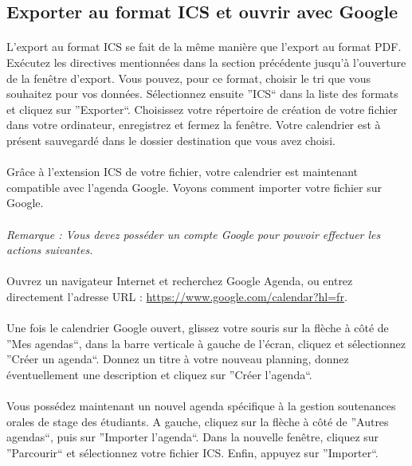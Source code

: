 \documentclass[a4paper,10pt]{report}
\begin{document}
      \subsection{Exporter au format ICS et ouvrir avec Google}
	  
	\paragraph{}
	  L'export au format ICS se fait de la même manière que l'export au format PDF.
	  Exécutez les directives mentionnées dans la section précédente jusqu'à l'ouverture de la fenêtre d'export.
	  Vous pouvez, pour ce format, choisir le tri que vous souhaitez pour vos données.
	  Sélectionnez ensuite ''ICS`` dans la liste des formats et cliquez sur ''Exporter``.
	  Choisissez votre répertoire de création de votre fichier dans votre ordinateur, enregistrez  et fermez la fenêtre.
	  Votre calendrier est à présent sauvegardé dans le dossier destination que vous avez choisi.
	  
	\paragraph{}
	  Grâce à l'extension ICS de votre fichier, votre calendrier est maintenant compatible avec l'agenda Google.
	  Voyons comment importer votre fichier sur Google.
	  
	  
	\paragraph{}
	  \textit{Remarque : Vous devez posséder un compte Google pour pouvoir effectuer les actions suivantes.}
	
	\paragraph{}
	  Ouvrez un navigateur Internet et recherchez Google Agenda, ou entrez directement l'adresse URL : \url{https://www.google.com/calendar?hl=fr}.
	  ~\\~\\
	  Une fois le calendrier Google ouvert, glissez votre souris sur la flèche à côté de ''Mes agendas``, dans la barre verticale à gauche de l'écran, cliquez et sélectionnez ''Créer un agenda``.
	  Donnez un titre à votre nouveau planning, donnez éventuellement une description et cliquez sur ''Créer l'agenda``.
	  ~\\~\\
	  Vous possédez maintenant un nouvel agenda spécifique à la gestion soutenances orales de stage des étudiants.
	  A gauche, cliquez sur la flèche à côté de ''Autres agendas``, puis sur ''Importer l'agenda``.
	  Dans la nouvelle fenêtre, cliquez sur ''Parcourir`` et sélectionnez votre fichier ICS.
	  Enfin, appuyez sur ''Importer``.
	  
\end{document}
